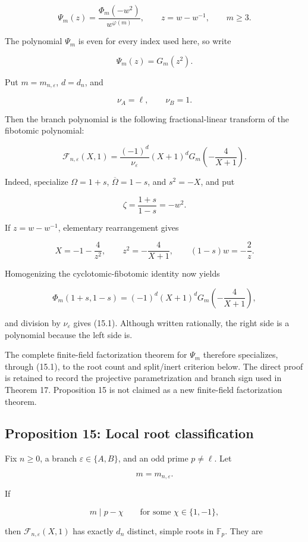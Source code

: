 \documentclass[11pt]{article}
\begin{document}
\[
\Psi_m(z)
=
\frac{\Phi_m(-w^2)}{w^{\varphi(m)}},
\qquad
z=w-w^{-1},
\qquad
m\geq3.
\]

The polynomial \(\Psi_m\) is even for every index used here, so write

\[
\Psi_m(z)=G_m(z^2).
\]

Put \(m=m_{n,\varepsilon}\), \(d=d_n\), and

\[
\nu_A=\ell,
\qquad
\nu_B=1.
\]

Then the branch polynomial is the following fractional-linear transform
of the fibotomic polynomial:

\[
\boxed{
\mathcal F_{n,\varepsilon}(X,1)
=
\frac{(-1)^d}{\nu_\varepsilon}
(X+1)^d
G_m\left(-\frac4{X+1}\right).
}
\tag{15.1}
\]

Indeed, specialize \(\Omega=1+s\),
\(\overline\Omega=1-s\), and \(s^2=-X\), and put

\[
\zeta=\frac{1+s}{1-s}=-w^2.
\]

If \(z=w-w^{-1}\), elementary rearrangement gives

\[
X=-1-\frac4{z^2},
\qquad
z^2=-\frac4{X+1},
\qquad
(1-s)w=-\frac2z.
\]

Homogenizing the cyclotomic-fibotomic identity now yields

\[
\Phi_m(1+s,1-s)
=
(-1)^d(X+1)^d
G_m\left(-\frac4{X+1}\right),
\]

and division by \(\nu_\varepsilon\) gives (15.1). Although written
rationally, the right side is a polynomial because the left side is.

The complete finite-field factorization theorem for \(\Psi_m\) therefore
specializes, through (15.1), to the root count and split/inert criterion
below. The direct proof is retained to record the projective
parametrization and branch sign used in Theorem 17. Proposition 15 is not
claimed as a new finite-field factorization theorem.

\subsection{Proposition 15: Local root classification}

Fix \(n\geq0\), a branch \(\varepsilon\in\{A,B\}\), and an odd prime
\(p\ne\ell\). Let

\[
m=m_{n,\varepsilon}.
\]

If

\[
m\mid p-\chi
\qquad
\text{for some }\chi\in\{1,-1\},
\]

then \(\mathcal F_{n,\varepsilon}(X,1)\) has exactly \(d_n\) distinct,
simple roots in \(\mathbb F_p\). They are
\end{document}
